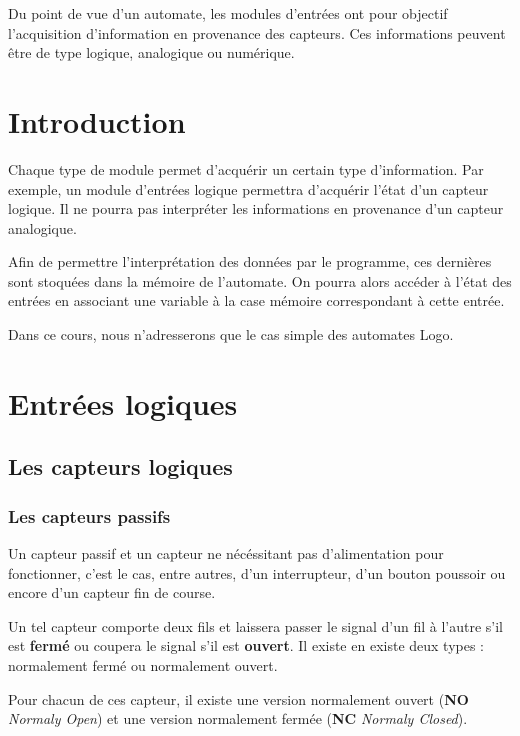 \documentclass[11pt]{article}
\begin{document}
\UPSTIbuildPage


\tableofcontents
\pagebreak

Du point de vue d'un automate, les modules d'entrées ont pour objectif l'acquisition d'information en provenance des capteurs. Ces informations peuvent être de type logique, analogique ou numérique. 

\section{Introduction}
Chaque type de module permet d'acquérir un certain type d'information. Par exemple, un module d'entrées logique permettra d'acquérir l'état d'un capteur logique. Il ne pourra pas interpréter les informations en provenance d'un capteur analogique. 

Afin de permettre l'interprétation des données par le programme, ces dernières sont stoquées dans la mémoire de l'automate. On pourra alors accéder à l'état des entrées en associant une variable à la case mémoire correspondant à cette entrée. 

Dans ce cours, nous n'adresserons que le cas simple des automates Logo. 


\section{Entrées logiques}
\subsection{Les capteurs logiques}
\subsubsection{Les capteurs passifs}
Un capteur passif et un capteur ne nécéssitant pas d'alimentation pour fonctionner, c'est le cas, entre autres, d'un interrupteur, d'un bouton poussoir ou encore d'un capteur fin de course. 

Un tel capteur comporte deux fils et laissera passer le signal d'un fil à l'autre s'il est \textbf{fermé} ou coupera le signal s'il est \textbf{ouvert}. Il existe en existe deux types : normalement fermé ou normalement ouvert. 

Pour chacun de ces capteur, il existe une version normalement ouvert (\textbf{NO} \textit{Normaly Open}) et une version normalement fermée (\textbf{NC} \textit{Normaly Closed}). 
\end{document}
